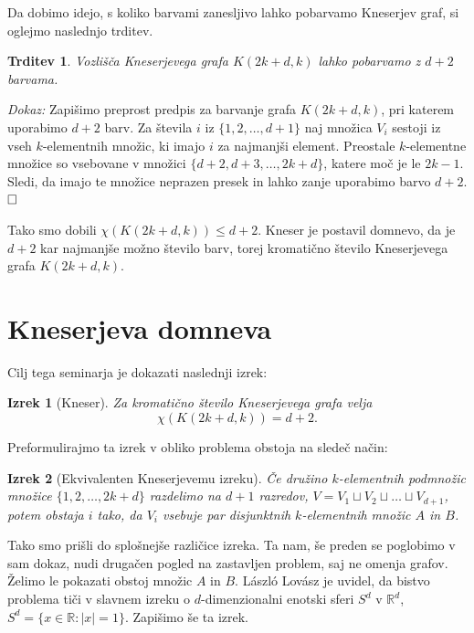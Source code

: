 \documentclass[a4paper,12pt]{article}
\def\qed{$\hfill\Box$}   %
\newtheorem{izrek}{Izrek}
\newtheorem{trditev}{Trditev}
\begin{document}
Da dobimo idejo, s koliko barvami zanesljivo lahko pobarvamo Kneserjev graf, si oglejmo naslednjo trditev.

\begin{trditev}
Vozlišča Kneserjevega grafa $K(2k+d,k)$ lahko pobarvamo z $d+2$ barvama.
\end{trditev}

\noindent
{\em Dokaz:}
Zapišimo preprost predpis za barvanje grafa $K(2k+d,k)$, pri katerem uporabimo $d+2$ barv. Za števila $i$ iz $\{1,2,\ldots,d+1\}$ naj množica $V_i$ sestoji iz vseh $k$-elementnih množic, ki imajo $i$ za najmanjši element. Preostale \mbox{$k$-elementne} množice so vsebovane v množici $\{d+2,d+3,\ldots,2k+d\}$, katere moč je le $2k-1$. Sledi, da imajo te množice neprazen presek in lahko zanje uporabimo barvo $d+2$.\qed

Tako smo dobili $\chi(K(2k+d,k)) \leq d+2$. Kneser je postavil domnevo, da je $d+2$ kar najmanjše možno število barv, torej kromatično število Kneserjevega grafa $K(2k+d,k)$.

\newpage

\section{Kneserjeva domneva}

Cilj tega seminarja je dokazati naslednji izrek:
\begin{izrek}[Kneser]
Za kromatično število Kneserjevega grafa velja
$$\chi(K(2k+d,k)) = d+2.$$
\end{izrek}

\noindent
Preformulirajmo ta izrek v obliko problema obstoja na sledeč način:

\begin{izrek}[Ekvivalenten Kneserjevemu izreku]
Če družino $k$-elementnih podmnožic množice $\{1, 2, \ldots, 2k+d\}$ razdelimo na $d+1$ razredov,  $V = V_1 \sqcup V_2 \sqcup \ldots \sqcup V_{d+1}$, potem obstaja $i$ tako, da $V_i$ vsebuje par disjunktnih $k$-elementnih množic $A$ in $B$.
\end{izrek}

Tako smo prišli do splošnejše različice izreka. Ta nam, še preden se poglobimo v sam dokaz, nudi drugačen pogled na zastavljen problem, saj ne omenja grafov. Želimo le pokazati obstoj množic $A$ in $B$. László Lovász je uvidel, da bistvo problema tiči v slavnem izreku o $d$-dimenzionalni enotski sferi $S^d$ v $\mathbb{R}^d $, $S^d = \{x \in \mathbb{R}: |x|=1\}$. Zapišimo še ta izrek.
\end{document}
